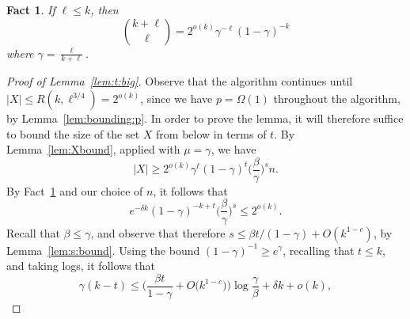 \documentclass[12pt,reqno]{amsart}
\newtheorem{fact}[theorem]{Fact}
\theoremstyle{definition}
\theoremstyle{remark}
\renewcommand{\le}{\leqslant}
\renewcommand{\ge}{\geqslant}
\begin{document}
\begin{fact}\label{fact:binomal:gammas}
If $\ell \le k$, then
$${k + \ell \choose \ell} = 2^{o(k)} \gamma^{-\ell} (1 - \gamma)^{-k}$$
where $\gamma = \frac{\ell}{k+\ell}$.
\end{fact}

\begin{proof}[Proof of Lemma~\ref{lem:t:big}]
Observe that the algorithm continues until $|X| \le R(k,\ell^{3/4}) = 2^{o(k)}$, since we have $p = \Omega(1)$ throughout the algorithm, by Lemma~\ref{lem:bounding:p}. In order to prove the lemma, it will therefore suffice to bound the size of the set $X$ from below in terms of $t$. By Lemma~\ref{lem:Xbound}, applied with $\mu = \gamma$, we have 
$$|X| \ge 2^{o(k)} \gamma^\ell (1 - \gamma)^t \bigg( \frac{\beta}{\gamma} \bigg)^s n.$$
By Fact~\ref{fact:binomal:gammas} and our choice of $n$, it follows that
$$e^{-\delta k} (1 - \gamma)^{-k+t} \bigg( \frac{\beta}{\gamma} \bigg)^s \le 2^{o(k)}.$$
Recall that $\beta \le \gamma$, and observe that therefore $s \le \beta t / (1 - \gamma) + O(k^{1-c})$, by Lemma~\ref{lem:s:bound}. Using the bound $(1 - \gamma)^{-1} \ge e^{\gamma}$, recalling that $t \le k$, and taking logs, it follows that
$$\gamma(k - t) \le \bigg( \frac{\beta t}{1 - \gamma} + O\big( k^{1-c} \big) \bigg) \log \frac{\gamma}{\beta} + \delta k + o(k),$$

\pagebreak


\end{proof}
\end{document}
